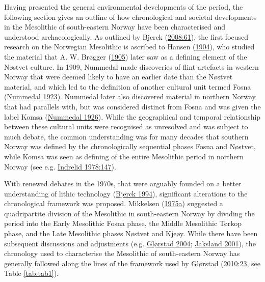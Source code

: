 \documentclass[
  12pt,
  a4paper,
  oneside]{book}
\begin{document}
Having presented the general environmental developments of the period, the following section gives an outline of how chronological and societal developments in the Mesolithic of south-eastern Norway have been characterised and understood archaeologically. As outlined by Bjerck (\protect\hyperlink{ref-bjerck2008}{2008:61}), the first focused research on the Norwegian Mesolithic is ascribed to Hansen (\protect\hyperlink{ref-hansen1904}{1904}), who studied the material that A. W. Brøgger (\protect\hyperlink{ref-brogger1905a}{1905}) later saw as a defining element of the Nøstvet culture. In 1909, Nummedal made discoveries of flint artefacts in western Norway that were deemed likely to have an earlier date than the Nøstvet material, and which led to the definition of another cultural unit termed Fosna (\protect\hyperlink{ref-nummedal1923}{Nummedal 1923}). Nummedal later also discovered material in northern Norway that had parallels with, but was considered distinct from Fosna and was given the label Komsa (\protect\hyperlink{ref-nummedal1926}{Nummedal 1926}). While the geographical and temporal relationship between these cultural units were recognised as unresolved and was subject to much debate, the common understanding was for many decades that southern Norway was defined by the chronologically sequential phases Fosna and Nøstvet, while Komsa was seen as defining of the entire Mesolithic period in northern Norway (see e.g. \protect\hyperlink{ref-indrelid1978}{Indrelid 1978:147}).

With renewed debates in the 1970s, that were arguably founded on a better understanding of lithic technology (\protect\hyperlink{ref-bjerck1994}{Bjerck 1994}), significant alterations to the chronological framework was proposed. Mikkelsen (\protect\hyperlink{ref-mikkelsen1975}{1975a}) suggested a quadripartite division of the Mesolithic in south-eastern Norway by dividing the period into the Early Mesolithic Fosna phase, the Middle Mesolithic Tørkop phase, and the Late Mesolithic phases Nøstvet and Kjeøy. While there have been subsequent discussions and adjustments (e.g. \protect\hyperlink{ref-gluxf8rstad2004}{Glørstad 2004}; \protect\hyperlink{ref-jaksland2001}{Jaksland 2001}), the chronology used to characterise the Mesolithic of south-eastern Norway has generally followed along the lines of the framework used by Glørstad (\protect\hyperlink{ref-glorstad2010}{2010:23}, see Table \ref{tab:tab1}).
\end{document}
